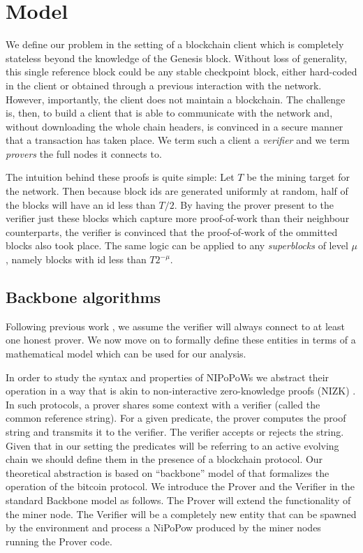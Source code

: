 \section{Model}

We define our problem in the setting of a blockchain client which is completely
stateless beyond the knowledge of the Genesis block. Without loss of
generality, this single reference block could be any stable checkpoint block,
either hard-coded in the client or obtained through a previous interaction with
the network. However, importantly, the client does not maintain a blockchain.
The challenge is, then, to build a client that is able to communicate with the
network and, without downloading the whole chain headers, is convinced in a
secure manner that a transaction has taken place. We term such a client a
\textit{verifier} and we term \textit{provers} the full nodes it connects to.

The intuition behind these proofs is quite simple: Let $T$ be the mining target
for the network. Then because block ids are generated uniformly at random, half
of the blocks will have an id less than $T / 2$. By having the prover present
to the verifier just these blocks which capture more proof-of-work than their
neighbour counterparts, the verifier is convinced that the proof-of-work of the
ommitted blocks also took place. The same logic can be applied to any
\textit{superblocks} of level $\mu$, namely blocks with id less than $T
2^{-\mu}$.

\subsection{Backbone algorithms}

Following previous work \cite{backbone} \cite{KLS}, we assume the verifier will
always connect to at least one honest prover. We now move on to formally define
these entities in terms of a mathematical model which can be used for our
analysis.

In order to study the syntax and properties of NIPoPoWs
we abstract their operation in a way that is akin to non-interactive
zero-knowledge proofs (NIZK) \cite{BFM88}. In such protocols, a prover
shares some context with a verifier (called the common reference string).
For a given predicate, the prover computes the proof string and transmits it
to the verifier. The verifier accepts or rejects the string. Given that in our
setting the predicates will be referring to an active evolving chain 
we should define them in the presence of a blockchain protocol. 
Our theoretical abstraction is based on ``backbone'' model of
\cite{backbone} that formalizes the operation of the bitcoin protocol.
We introduce the Prover and the Verifier in
the standard Backbone model as follows. The Prover will extend the functionality
of the miner node. The Verifier will be a completely new entity that can be spawned
by the environment and process a NiPoPow produced by the miner nodes running
the Prover code. 

